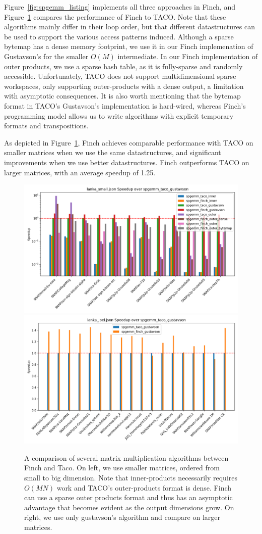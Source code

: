 Figure~\ref{fig:spgemm_listing} implements all three approaches in Finch, and Figure~\ref{fig:spgemm} compares the performance of Finch to TACO.
%
Note that these algorithms mainly differ in their loop order, but that different datastructures can be used to support the various access patterns induced.
%
Although a sparse bytemap has a dense memory footprint, we use it in our Finch implemenation of Gustavson's for the smaller $O(M)$ intermediate.
%
In our Finch implementation of outer products, we use a sparse hash table, as it is fully-sparse and randomly accessible.
%
Unfortunately, TACO does not support multidimensional sparse workspaces, only supporting outer-products with a dense output, a limitation with asymptotic consequences.
%
It is also worth mentioning that the bytemap format in TACO's Gustavson's implementation is hard-wired, whereas Finch's programming model allows us to write algorithms with explicit temporary formats and transpositions.

As depicted in Figure~\ref{fig:spgemm}, Finch achieves comparable performance with TACO on smaller matrices when we use the same datastructures, and significant improvements when we use better datastructures. Finch outperforms TACO on larger matrices, with an average speedup of 1.25. %


\begin{figure}
	\includegraphics[width=0.5\linewidth]{spgemm_small_speedup_log_scale.png}%
	\includegraphics[width=0.5\linewidth]{spgemm_joel_speedup.png}
    \vspace{-8pt}
    \caption{A comparison of several matrix multiplication algorithms between
    Finch and Taco. On left, we use smaller matrices, ordered from small to big
    dimension. Note that inner-products necessarily requires $O(MN)$ work and
    TACO's outer-products format is dense. Finch can use a sparse outer products
    format and thus has an asymptotic advantage that becomes evident as the
    output dimensions grow. On right, we use only gustavson's algorithm and
    compare on larger matrices.}
    \label{fig:spgemm}
    \vspace{-12pt}
\end{figure}

